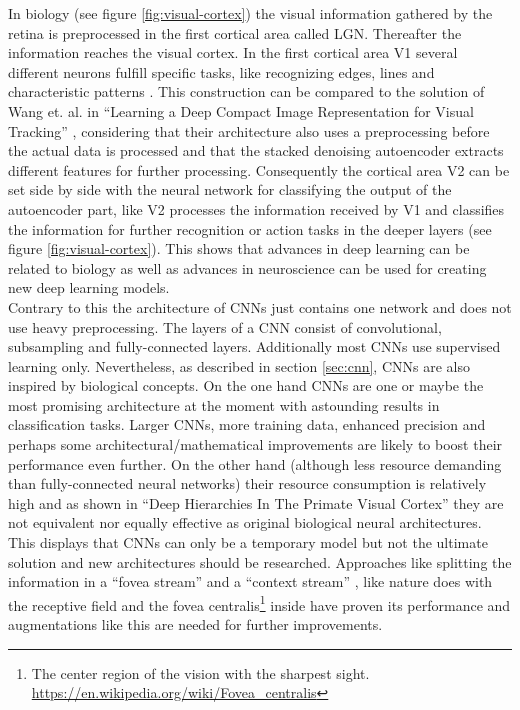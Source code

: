 \documentclass[12pt,twoside]{article}
\theoremstyle{plain}
\theoremstyle{definition}
\theoremstyle{remark}
\begin{document}
In biology (see figure \ref{fig:visual-cortex}) the visual information gathered by the retina is preprocessed in the first cortical area called LGN. Thereafter the information reaches the visual cortex. In the first cortical area V1 several different neurons fulfill specific tasks, like recognizing edges, lines and characteristic patterns \cite{HigherOrderVisualProcessing}. This construction can be compared to the solution of Wang et. al. in \enquote{Learning a Deep Compact Image Representation for Visual Tracking} \cite{LearningDeepCompactImageTracking-Wang}, considering that their architecture also uses a preprocessing before the actual data is processed and that the stacked denoising autoencoder extracts different features for further processing. Consequently the cortical area V2 can be set side by side with the neural network for classifying the output of the autoencoder part, like V2 processes the information received by V1 and classifies the information for further recognition or action tasks in the deeper layers (see figure \ref{fig:visual-cortex}). This shows that advances in deep learning can be related to biology as well as advances in neuroscience can be used for creating new deep learning models.
\\
Contrary to this the architecture of CNNs just contains one network and does not use heavy preprocessing. The layers of a CNN consist of convolutional, subsampling and fully-connected layers. Additionally most CNNs use supervised learning only. Nevertheless, as described in section \ref{sec:cnn}, CNNs are also inspired by biological concepts.
On the one hand CNNs are one or maybe the most promising architecture at the moment \cite{GoogLeNet, ImangeNetClassificationCNN-Krizhevsky} with astounding results in classification tasks. Larger CNNs, more training data, enhanced precision and perhaps some architectural/mathematical improvements are likely to boost their performance even further.
On the other hand (although less resource demanding than fully-connected neural networks) their resource consumption is relatively high and as shown in \enquote{Deep Hierarchies In The Primate Visual Cortex} \cite{DeepHierarchiesVisualCortex-kruger} they are not equivalent nor equally effective as original biological neural architectures. This displays that CNNs can only be a temporary model but not the ultimate solution and new architectures should be researched. Approaches like splitting the information in a \enquote{fovea stream} and a \enquote{context stream} \cite{GoogleLargeScaleVideoClassification-Karpathy}, like nature does with the receptive field and the fovea centralis\footnote{The center region of the vision with the sharpest sight. \url{https://en.wikipedia.org/wiki/Fovea_centralis}} inside have proven its performance and augmentations like this are needed for further improvements.
\end{document}
